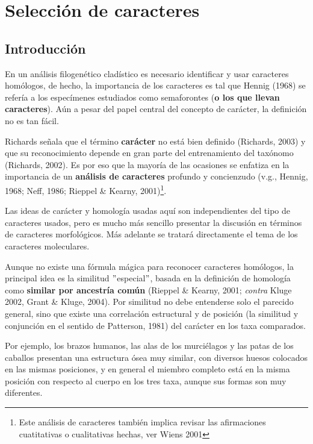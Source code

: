 \chapter{Selecci\'on de caracteres}
\section*{Introducci\'on}

En un an\'alisis filogen\'etico clad\'istico es necesario identificar y usar caracteres hom\'ologos, de hecho, la importancia de los caracteres es tal que Hennig (1968) se refer\'ia a los espec\'imenes estudiados como semaforontes (\textbf{o los que llevan caracteres}). A\'un a pesar del papel central del concepto de car\'acter, la definici\'on no es tan f\'acil.


Richards se\~nala que el t\'ermino 
\textbf{car\'acter} no est\'a bien definido (Richards, 2003) y que su 
reconocimiento depende en gran parte del entrenamiento del tax\'onomo 
(Richards, 2002). 
Es por eso que la mayor\'ia de las ocasiones se 
enfatiza en la importancia de un \textbf{an\'alisis de caracteres} 
profundo y concienzudo (v.g., Hennig, 1968; Neff, 1986; Rieppel \& 
Kearny, 2001)\footnote{Este an\'alisis de caracteres tambi\'en implica revisar las afirmaciones cuatitativas o cualitativas hechas, ver 
Wiens 2001 
}.

Las ideas de car\'acter y homolog\'ia usadas aqu\'i 
son independientes del tipo de caracteres usados, pero es mucho m\'as 
sencillo presentar la discusi\'on en t\'erminos de caracteres 
morfol\'ogicos. M\'as adelante se tratar\'a directamente el tema de los 
caracteres moleculares. 

Aunque no existe una f\'ormula m\'agica para reconocer caracteres hom\'ologos, 
la principal idea es la similitud $"$especial$"$, basada en 
la definici\'on de homolog\'ia como \textbf {similar por ancestr\'ia 
com\'un} (Rieppel \& Kearny, 2001; \textit {contra} Kluge 2002, 
Grant \& Kluge, 2004). Por similitud no debe entenderse solo el 
parecido general, sino que existe una correlaci\'on estructural y de 
posici\'on (la similitud y conjunci\'on en el sentido de Patterson, 
1981) del car\'acter en los taxa comparados. 

Por ejemplo, los brazos humanos, las alas de los murci\'elagos y las 
patas de los caballos presentan una estructura \'osea muy similar, 
con diversos huesos colocados en las mismas posiciones, y en general 
el miembro completo est\'a en la misma posici\'on con respecto al 
cuerpo en los tres taxa, aunque sus formas son muy diferentes. 



